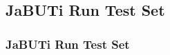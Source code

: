\subsection{JaBUTi Run Test Set}
\label{example:jabuti-run-test-set}

\begin{frame}[imacidie]
\frametitle{JaBUTi Run Test Set}

\end{frame}